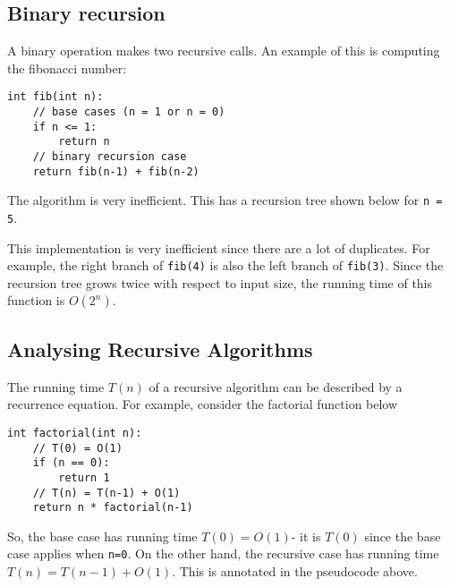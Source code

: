 \documentclass[a4paper, openany]{memoir}
\begin{document}
\subsection{Binary recursion}
A binary operation makes two recursive calls. An example of this is computing the fibonacci number:
\begin{lstlisting}[language=pseudocode]
int fib(int n):
    // base cases (n = 1 or n = 0)
    if n <= 1:
        return n
    // binary recursion case
    return fib(n-1) + fib(n-2)
\end{lstlisting}
The algorithm is very inefficient. This has a recursion tree shown below for \texttt{n = 5}.
\begin{center}
\end{center}
This implementation is very inefficient since there are a lot of duplicates. For example, the right branch of \texttt{fib(4)} is also the left branch of \texttt{fib(3)}. Since the recursion tree grows twice with respect to input size, the running time of this function is $O(2^n)$.

\subsection{Analysing Recursive Algorithms}
The running time $T(n)$ of a recursive algorithm can be described by a recurrence equation. For example, consider the factorial function below
\begin{lstlisting}[language=pseudocode]
int factorial(int n):
    // T(0) = O(1)
    if (n == 0):
        return 1
    // T(n) = T(n-1) + O(1)
    return n * factorial(n-1)
\end{lstlisting}
So, the base case has running time $T(0) = O(1)$- it is $T(0)$ since the base case applies when \texttt{n=0}. On the other hand, the recursive case has running time $T(n) = T(n-1) + O(1)$. This is annotated in the pseudocode above.
\end{document}
